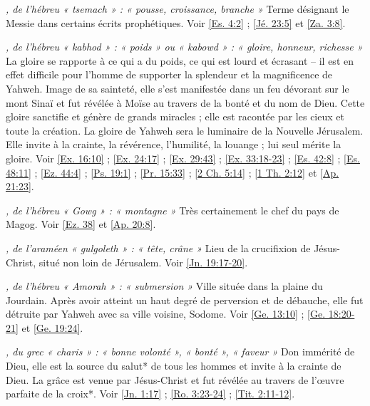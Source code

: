 \begin{multicols}{2}
\textit{, de l'hébreu « tsemach » : « pousse, croissance, branche »}\newline
Terme désignant le Messie dans certains écrits prophétiques. Voir \vref{Es. 4:2} ; \vref{Jé. 23:5} et \vref{Za. 3:8}.

\textit{, de l'hébreu « kabhod » : « poids » ou « kabowd » : « gloire, honneur, richesse »}\newline
La gloire se rapporte à ce qui a du poids, ce qui est lourd et écrasant – il est en effet difficile pour l'homme de supporter la splendeur et la magnificence de Yahweh. Image de sa sainteté, elle s'est manifestée dans un feu dévorant sur le mont Sinaï et fut révélée à Moïse au travers de la bonté et du nom de Dieu. Cette gloire sanctifie et génère de grands miracles ; elle est racontée par les cieux et toute la création. La gloire de Yahweh sera le luminaire de la Nouvelle Jérusalem. Elle invite à la crainte, la révérence, l'humilité, la louange ; lui seul mérite la gloire. Voir \vref{Ex. 16:10} ; \vref{Ex. 24:17} ; \vref{Ex. 29:43} ; \vref{Ex. 33:18-23} ; \vref{Es. 42:8} ; \vref{Es. 48:11} ; \vref{Ez. 44:4} ; \vref{Ps. 19:1} ; \vref{Pr. 15:33} ; \vref{2 Ch. 5:14} ; \vref{1 Th. 2:12} et \vref{Ap. 21:23}.

\textit{, de l'hébreu « Gowg » : « montagne »}\newline
Très certainement le chef du pays de Magog. Voir \vref{Ez. 38} et \vref{Ap. 20:8}.

\textit{, de l'araméen « gulgoleth » : « tête, crâne »}\newline
Lieu de la crucifixion de Jésus-Christ, situé non loin de Jérusalem. Voir \vref{Jn. 19:17-20}.

\textit{, de l'hébreu « Amorah » : « submersion »}\newline
Ville située dans la plaine du Jourdain. Après avoir atteint un haut degré de perversion et de débauche, elle fut détruite par Yahweh avec sa ville voisine, Sodome. Voir \vref{Ge. 13:10} ; \vref{Ge. 18:20-21} et \vref{Ge. 19:24}.

\textit{, du grec « charis » : « bonne volonté », « bonté », « faveur »}\newline
Don immérité de Dieu, elle est la source du salut* de tous les hommes et invite à la crainte de Dieu. La grâce est venue par Jésus-Christ et fut révélée au travers de l'œuvre parfaite de la croix*. Voir \vref{Jn. 1:17} ; \vref{Ro. 3:23-24} ; \vref{Tit. 2:11-12}.


\end{multicols}
